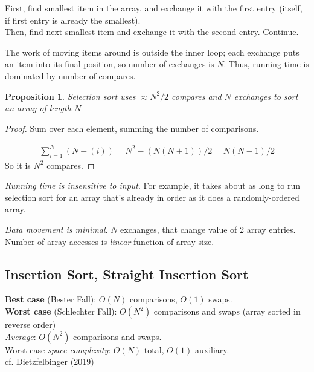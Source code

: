 \documentclass[10pt]{amsart}
\newtheorem{proposition}{Proposition}
\begin{document}
\begin{multicols*}{2}
First, find smallest item in the array, and exchange it with the first entry (itself, if first entry is already the smallest). \\
Then, find next smallest item and exchange it with the second entry. Continue.

The work of moving items around is outside the inner loop; each exchange puts an item into its final position, so number of exchanges is $N$. Thus, running time is dominated by number of compares.

\begin{proposition}
	Selection sort uses $ \approx N^2 /2 $ compares and $N$ exchanges to sort an array of length $N$
\end{proposition}

\begin{proof}

Sum over each element, summing the number of comparisons.

\[
\begin{gathered}
	\sum_{i=1}^{N} (N - (i)) = N^2 - (N (N + 1) ) / 2 = N (N - 1) / 2
\end{gathered}
\]
So it is $N^2$ compares.

\end{proof}

\emph{Running time is insensitive to input}. For example, it takes about as long to run selection sort for an array that's already in order as it does a randomly-ordered array.

\emph{Data movement is minimal}. $N$ exchanges, that change value of 2 array entries. Number of array accesses is \emph{linear} function of array size. 



\subsection{Insertion Sort, Straight Insertion Sort}

\textbf{Best case} (Bester Fall): $O(N)$ comparisons, $O(1)$ swaps. \\
\textbf{Worst case} (Schlechter Fall): $O(N^2)$ comparisons and swaps (array sorted in reverse order) \\
\emph{Average}: $O(N^2)$ comparisons and swaps. \\

Worst case \emph{space complexity}: $O(N)$ total, $O(1)$ auxiliary. \\


cf. Dietzfelbinger (2019) \cite{Diet2019}


\end{multicols*}
\end{document}
